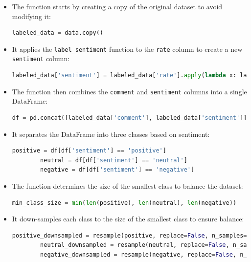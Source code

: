 \documentclass{solutionclass} %
\begin{document}
\begin{solution}
\begin{itemize}
	\item The function starts by creating a copy of the original dataset to avoid modifying it:
	\begin{lstlisting}[language=Python]
		labeled_data = data.copy()
	\end{lstlisting}
	
	\item It applies the \texttt{label\_sentiment} function to the \texttt{rate} column to create a new \texttt{sentiment} column:
	\begin{lstlisting}[language=Python]
		labeled_data['sentiment'] = labeled_data['rate'].apply(lambda x: label_sentiment(x, positive_threshold, neutral_threshold))
	\end{lstlisting}
	
	\item The function then combines the \texttt{comment} and \texttt{sentiment} columns into a single DataFrame:
	\begin{lstlisting}[language=Python]
		df = pd.concat([labeled_data['comment'], labeled_data['sentiment']], axis=1)
	\end{lstlisting}
	
	\item It separates the DataFrame into three classes based on sentiment:
	\begin{lstlisting}[language=Python]
		positive = df[df['sentiment'] == 'positive']
		neutral = df[df['sentiment'] == 'neutral']
		negative = df[df['sentiment'] == 'negative']
	\end{lstlisting}
	
	\item The function determines the size of the smallest class to balance the dataset:
	\begin{lstlisting}[language=Python]
		min_class_size = min(len(positive), len(neutral), len(negative))
	\end{lstlisting}
	
	\item It down-samples each class to the size of the smallest class to ensure balance:
	\begin{lstlisting}[language=Python]
		positive_downsampled = resample(positive, replace=False, n_samples=min_class_size, random_state=42)
		neutral_downsampled = resample(neutral, replace=False, n_samples=min_class_size, random_state=42)
		negative_downsampled = resample(negative, replace=False, n_samples=min_class_size, random_state=42)
	\end{lstlisting}
	

\end{itemize}
\end{solution}
\end{document}
